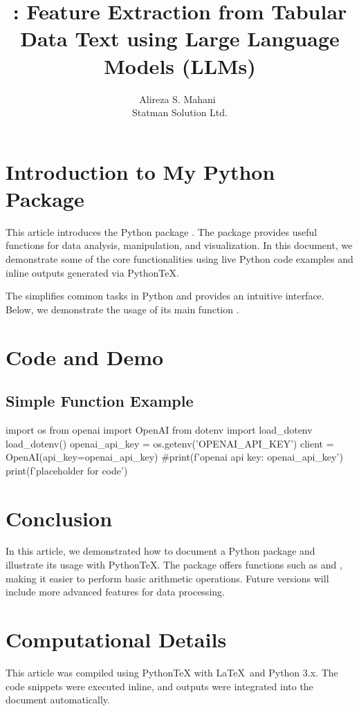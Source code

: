 \documentclass[article]{jss}
\author{Alireza S. Mahani~\orcidlink{0000-0002-7932-6681}\\Statman Solution Ltd.}
\title{\pkg{TabuLLM}: Feature Extraction from Tabular Data Text using Large Language Models (LLMs)}
\begin{document}
\section[Introduction to My Python Package]{Introduction to My Python Package} \label{sec:intro}

\begin{leftbar}
This article introduces the Python package . The package provides 
useful functions for data analysis, manipulation, and visualization. In this 
document, we demonstrate some of the core functionalities using live Python 
code examples and inline outputs generated via PythonTeX.
\end{leftbar}

The  simplifies common tasks in Python and provides an 
intuitive interface. Below, we demonstrate the usage of its main function 
.

\section{Code and Demo} \label{sec:code-demo}

\subsection{Simple Function Example}

\begin{pyblock}
import os
from openai import OpenAI
from dotenv import load_dotenv
load_dotenv()
openai_api_key = os.getenv('OPENAI_API_KEY')
client = OpenAI(api_key=openai_api_key)
#print(f'openai api key: {openai_api_key}')
print(f'placeholder for code')
\end{pyblock}
\stdoutpythontex %


\section{Conclusion} \label{sec:conclusion}

In this article, we demonstrated how to document a Python package and 
illustrate its usage with PythonTeX. The package  offers 
functions such as  and , making 
it easier to perform basic arithmetic operations. Future versions will include 
more advanced features for data processing.

\section*{Computational Details}

This article was compiled using PythonTeX with \LaTeX\ and Python 3.x. 
The code snippets were executed inline, and outputs were integrated into 
the document automatically.
\end{document}
